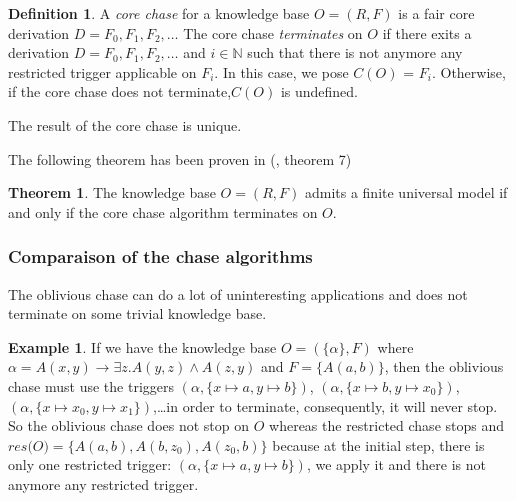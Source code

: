 \documentclass{article}
\theoremstyle{definition}
\newtheorem{definition}{Definition}[section]
\newtheorem{theorem}{Theorem}[section]
\newtheorem{example}{Example}[section]
\theoremstyle{remark}
\def \N {\mathbb N}
\begin{document}
\begin{definition}
A \emph{core chase} for a knowledge base $O= (R,F)$ is a fair core derivation $D=F_0,F_1,F_2,\ldots$ The core chase \emph{terminates} on $O$ if there exits a derivation $D=F_0,F_1,F_2,\ldots$ and $i \in \N$ such that there is not anymore any restricted trigger applicable on $F_i$. In this case, we pose \emph{$\textit{C}(O)$} = $F_i$.
Otherwise, if the core chase does not terminate,$\textit{C}(O)$ is undefined.
\end{definition}

The result of the core chase is unique.

The following theorem has been proven in (\cite{core_chase}, theorem 7)

\begin{theorem}
The knowledge base $O = (R,F)$ admits a finite universal model if and only if the core chase algorithm terminates on $O$.
\end{theorem}

\subsubsection{Comparaison of the chase algorithms}

The oblivious chase  can do a lot of uninteresting applications and does not terminate on some trivial knowledge base. 
\begin{example}
If we have the knowledge base $O=(\{\alpha\},F)$ where $\alpha = A(x,y) \rightarrow \exists z.A(y,z) \wedge A(z,y)$ and $F =  \{A(a,b)\}$, then the oblivious chase must use the triggers $(\alpha, \{x \mapsto a, y \mapsto b\})$, $(\alpha, \{x \mapsto b, y \mapsto x_0\})$,$(\alpha, \{x \mapsto x_0, y \mapsto x_1\})$,\ldots in order to terminate, consequently, it will never stop. So the oblivious chase does not stop on $O$ whereas the restricted chase stops and $\textit{res(O)} = \{A(a,b),A(b,z_0),A(z_0,b)\}$ because at the initial step, there is only one restricted trigger: $(\alpha, \{x \mapsto a, y \mapsto b\})$, we apply it and there is not anymore any restricted trigger.
\end{example}
\end{document}

